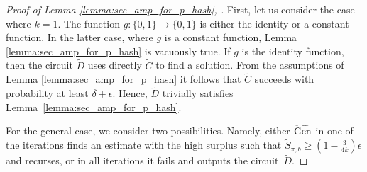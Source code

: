 \begin{proof}[Proof of Lemma \ref{lemma:sec_amp_for_p_hash}, \cite{holenstein2011general}]
First, let us consider the case where $k=1$. The function $g: \{0,1\} \rightarrow \{0,1\}$ is either the identity or a constant function.
In the latter case, where $g$ is a constant function, Lemma \ref{lemma:sec_amp_for_p_hash} is vacuously true.
If $g$ is the identity function, then the circuit $\widetilde{D}$ uses directly $\widetilde{C}$ to find a solution.
From the assumptions of Lemma \ref{lemma:sec_amp_for_p_hash} it follows that $\widetilde{C}$ succeeds with probability at least
$\delta + \epsilon$. Hence, $\widetilde{D}$ trivially satisfies Lemma~\ref{lemma:sec_amp_for_p_hash}.

For the general case, we consider two possibilities.
Namely, either $\widetilde{\operatorname{\text{Gen}}}$ in one of the iterations finds an estimate with the high surplus
such that $\widetilde{S}_{\pi, b} \geq (1-\frac{3}{4k})\epsilon$ and recurses,
or in all iterations it fails and outputs the circuit~$\widetilde{D}$.


\end{proof}
